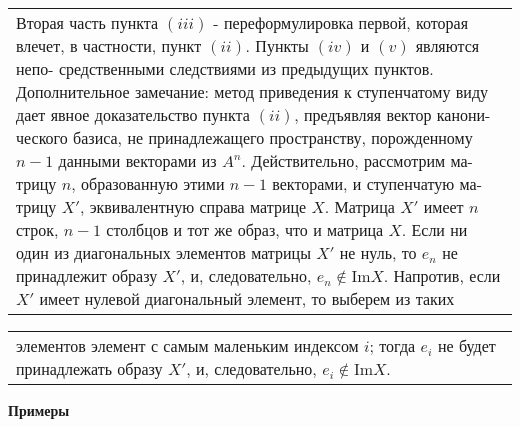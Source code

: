 \begin{tabular}{|p{13cm}}
	Вторая часть пункта $(iii)$ - переформулировка первой, которая\linebreak
	влечет, в частности, пункт $(ii)$. Пункты $(iv)$ и $(v)$ являются непо-\linebreak
	средственными следствиями из предыдущих пунктов.\linebreak
	Дополнительное замечание: метод приведения к ступенчатому виду\linebreak
	дает явное доказательство пункта $(ii)$, предъявляя вектор канони-\linebreak
	ческого базиса, не принадлежащего пространству, порожденному\linebreak
	$n - 1$ данными векторами из $A^n$. Действительно, рассмотрим ма-\linebreak
	трицу $n$, образованную этими $n - 1$ векторами, и ступенчатую ма-\linebreak
	трицу $X'$, эквивалентную справа матрице $X$. Матрица $X'$ имеет\linebreak
	$n$ строк, $n - 1$ столбцов и тот же образ, что и матрица $X$. Если\linebreak
	ни один из диагональных элементов матрицы $X'$ не нуль, то $e_n$ не\linebreak
	принадлежит образу $X'$, и, следовательно, $e_n \notin$Im$X$. Напротив,\linebreak
	если $X'$ имеет нулевой диагональный элемент, то выберем из таких
	\end{tabular}
	
	\pagebreak
	
	
	\begin{tabular}{|p{12.5cm}}
	\noindent
	элементов элемент с самым маленьким индексом $i$; тогда $e_i$ не будет\linebreak
	принадлежать образу $X'$, и, следовательно, $e_i\notin$Im$X$.
	\end{tabular}
	
	\noindent
	{\bf Примеры}
	
